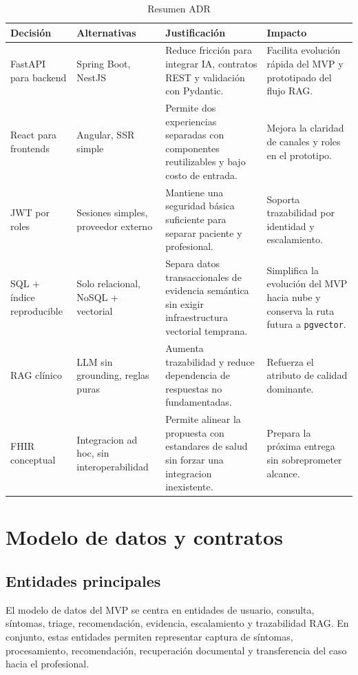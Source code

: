 \documentclass[12pt]{article}
\begin{document}
\begin{table}[ht]
\caption{Resumen ADR}
\label{tab:adr_summary}
\centering
\footnotesize
\begin{tabularx}{\textwidth}{>{\raggedright\arraybackslash}p{2.2cm} >{\raggedright\arraybackslash}p{2.9cm} >{\raggedright\arraybackslash}p{3.0cm} X}
\toprule
\textbf{Decisión} & \textbf{Alternativas} & \textbf{Justificación} & \textbf{Impacto} \\
\midrule
FastAPI para backend & Spring Boot, NestJS & Reduce fricción para integrar IA, contratos REST y validación con Pydantic. & Facilita evolución rápida del MVP y prototipado del flujo RAG. \\
React para frontends & Angular, SSR simple & Permite dos experiencias separadas con componentes reutilizables y bajo costo de entrada. & Mejora la claridad de canales y roles en el prototipo. \\
JWT por roles & Sesiones simples, proveedor externo & Mantiene una seguridad básica suficiente para separar paciente y profesional. & Soporta trazabilidad por identidad y escalamiento. \\
SQL + índice reproducible & Solo relacional, NoSQL + vectorial & Separa datos transaccionales de evidencia semántica sin exigir infraestructura vectorial temprana. & Simplifica la evolución del MVP hacia nube y conserva la ruta futura a \texttt{pgvector}. \\
RAG clínico & LLM sin grounding, reglas puras & Aumenta trazabilidad y reduce dependencia de respuestas no fundamentadas. & Refuerza el atributo de calidad dominante. \\
FHIR conceptual & Integracion ad hoc, sin interoperabilidad & Permite alinear la propuesta con estandares de salud sin forzar una integracion inexistente. & Prepara la próxima entrega sin sobreprometer alcance. \\
\bottomrule
\end{tabularx}
\end{table}

\section{Modelo de datos y contratos}

\subsection{Entidades principales}

El modelo de datos del MVP se centra en entidades de usuario, consulta, síntomas, triage, recomendación, evidencia, escalamiento y trazabilidad RAG. En conjunto, estas entidades permiten representar captura de síntomas, procesamiento, recomendación, recuperación documental y transferencia del caso hacia el profesional.
\end{document}
